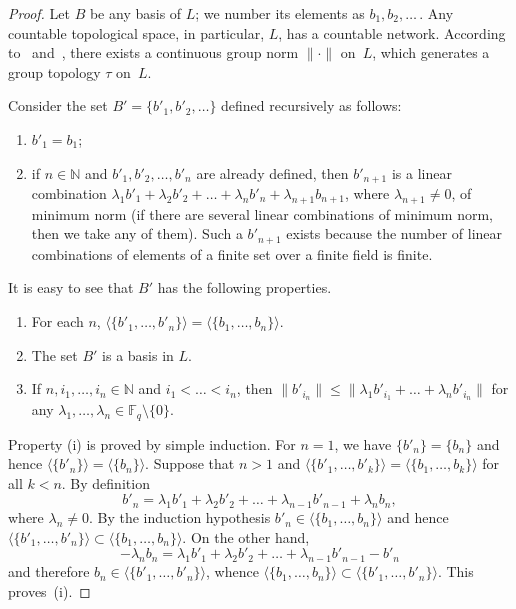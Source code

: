 \documentclass[10pt,a4paper]{amsart}
\theoremstyle{plain}
\theoremstyle{definition}
\theoremstyle{remark}
\begin{document}
\begin{proof}
Let $B$ be any basis of $L$; we number its elements as $b_1,b_2, \dots$\,. Any countable 
topological space, in particular, $L$, has a countable network. According to~\cite[Lemma~8.1.12]{AT} 
and~\cite{Graev50}, there exists a continuous group norm $\lVert\boldsymbol\cdot\rVert$ on~$L$, which 
generates a group topology $\tau$ on~$L$. 

Consider the set $B'=\{b'_1, b'_2, \dots\}$ defined recursively as follows: 
\begin{enumerate} 
\item[(i)] 
$b'_1= b_1$; 

\item[(ii)] 
if $n\in \mathbb N$ and $b'_1, b'_2, \dots, b'_{n}$ are already defined, then $b'_{n+1}$ is a linear 
combination $\lambda_1 b'_1 +\lambda_2 b'_2 + \dots+ \lambda_n b'_{n}+\lambda_{n+1} b_{n+1}$, where 
$\lambda_{n+1}\ne 0$, of minimum norm (if there are several linear combinations of minimum norm, then we take any 
of them). Such a $b'_{n+1}$ exists because the number of linear combinations of elements of a finite set over a 
finite field is finite.
\end{enumerate}

It is easy to see that $B'$ has the following properties.
\begin{enumerate} 
\item[(iii)]
For each $n$,  $\langle \{b'_1, \dots, b'_n\}\rangle = \langle \{b_1, \dots, b_n\}\rangle $.
\item[(iv)]
The set $B'$ is a basis in $L$. 
\item[(v)]
If $n, i_1,\dots, i_n\in \mathbb N$ and $i_1<\dots <i_n$, then $\|b'_{i_n}\|\le 
\|\lambda_1 b'_{i_1}+\dots +\lambda_n b'_{i_n}\|$ for any $\lambda_1, \dots, \lambda_n\in 
\mathbb F_q\setminus\{0\}$. 
\end{enumerate} 

Property (i) is proved by simple induction. For $n=1$, we have $\{b'_n\}=\{b_n\}$ and hence 
$\langle \{b'_n\}\rangle =\langle \{b_n\}\rangle$. Suppose that $n>1$ and 
$\langle \{b'_1, \dots, b'_k\}\rangle = \langle \{b_1, \dots, b_k\}\rangle$ for all $k<n$. 
By definition 
$$
b'_n=\lambda_1 b'_1+ \lambda_2b'_2+ \dots +\lambda_{n-1}b'_{n-1}+\lambda_n b_n,
$$ 
where $\lambda_n\ne 0$. By the induction hypothesis 
$b'_n\in \langle \{b_1, \dots, b_n\}\rangle$ and hence $\langle \{b'_1, \dots, b'_n\}\rangle \subset 
\langle \{b_1, \dots, b_n\}\rangle$. On the other hand, 
$$
-\lambda_n b_n= \lambda_1 b'_1+ \lambda_2b'_2+ \dots +\lambda_{n-1}b'_{n-1}-b'_n
$$ 
and therefore  
$b_n\in \langle \{b'_1, \dots, b'_{n}\}\rangle$, whence 
$\langle \{b_1, \dots, b_n\}\rangle \subset \langle \{b'_1, \dots, b'_n\}\rangle$. This proves~(i).




\end{proof}
\end{document}
